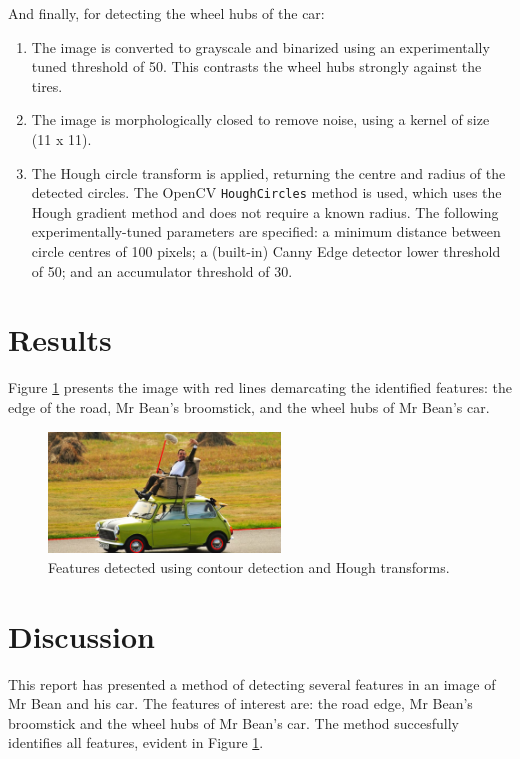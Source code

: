 And finally, for detecting the wheel hubs of the car:
\begin{enumerate}
  \item The image is converted to grayscale and binarized using an experimentally tuned threshold of 50. This contrasts the wheel hubs strongly against the tires.

  \item The image is morphologically closed to remove noise, using a kernel of size (11 x 11).

  \item The Hough circle transform is applied, returning the centre and radius of the detected circles. The OpenCV \texttt{HoughCircles} method is used, which uses the Hough gradient method and does not require a known radius. The following experimentally-tuned parameters are specified: a minimum distance between circle centres of 100 pixels; a (built-in) Canny Edge detector lower threshold of 50; and an accumulator threshold of 30.

\end{enumerate}

\section{Results}

Figure \ref{fig:q3results} presents the image with red lines demarcating the identified features: the edge of the road, Mr Bean's broomstick, and the wheel hubs of Mr Bean's car.

\begin{figure}[ht]
  \centering
  \includegraphics[width=0.55\textwidth]{images/q3_results.png}
  \caption{Features detected using contour detection and Hough transforms.}
  \label{fig:q3results}
\end{figure}

\newpage
\section{Discussion}

This report has presented a method of detecting several features in an image of Mr Bean and his car. The features of interest are: the road edge, Mr Bean's broomstick and the wheel hubs of Mr Bean's car. The method succesfully identifies all features, evident in Figure \ref{fig:q3results}.

